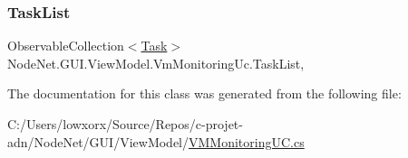 \mbox{\label{class_node_net_1_1_g_u_i_1_1_view_model_1_1_vm_monitoring_uc_a5f4d83fbaefb0b70b26e4d87f3945407}} 
\subsubsection{\texorpdfstring{Task\+List}{TaskList}}
{\footnotesize\ttfamily Observable\+Collection$<$\hyperlink{class_node_net_1_1_tasks_1_1_task}{Task}$>$ Node\+Net.\+G\+U\+I.\+View\+Model.\+Vm\+Monitoring\+Uc.\+Task\+List\hspace{0.3cm}{\ttfamily [get]}, {\ttfamily [set]}}



The documentation for this class was generated from the following file\+:\begin{DoxyCompactItemize}
\item 
C\+:/\+Users/lowxorx/\+Source/\+Repos/c-\/projet-\/adn/\+Node\+Net/\+G\+U\+I/\+View\+Model/\hyperlink{_v_m_monitoring_u_c_8cs}{V\+M\+Monitoring\+U\+C.\+cs}\end{DoxyCompactItemize}
